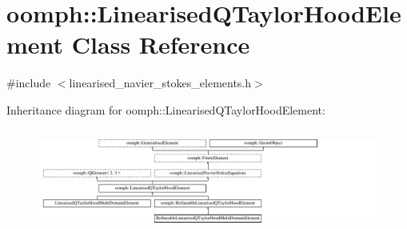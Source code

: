 \hypertarget{classoomph_1_1LinearisedQTaylorHoodElement}{}\section{oomph\+:\+:Linearised\+Q\+Taylor\+Hood\+Element Class Reference}
\label{classoomph_1_1LinearisedQTaylorHoodElement}


{\ttfamily \#include $<$linearised\+\_\+navier\+\_\+stokes\+\_\+elements.\+h$>$}

Inheritance diagram for oomph\+:\+:Linearised\+Q\+Taylor\+Hood\+Element\+:\begin{figure}[H]
\begin{center}
\leavevmode
\includegraphics[height=3.414634cm]{classoomph_1_1LinearisedQTaylorHoodElement}
\end{center}
\end{figure}
